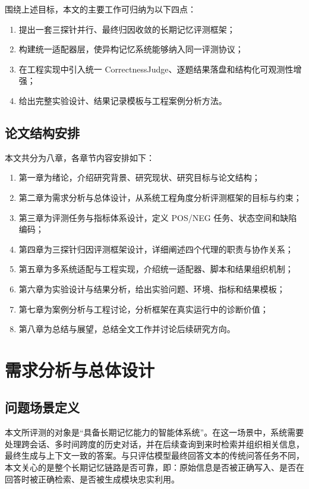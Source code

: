 围绕上述目标，本文的主要工作可归纳为以下四点：

\begin{enumerate}
    \item 提出一套三探针并行、最终归因收敛的长期记忆评测框架；
    \item 构建统一适配器层，使异构记忆系统能够纳入同一评测协议；
    \item 在工程实现中引入统一 CorrectnessJudge、逐题结果落盘和结构化可观测性增强；
    \item 给出完整实验设计、结果记录模板与工程案例分析方法。
\end{enumerate}

\section{论文结构安排}

本文共分为八章，各章节内容安排如下：

\begin{enumerate}
    \item 第一章为绪论，介绍研究背景、研究现状、研究目标与论文结构；
    \item 第二章为需求分析与总体设计，从系统工程角度分析评测框架的目标与约束；
    \item 第三章为评测任务与指标体系设计，定义 POS/NEG 任务、状态空间和缺陷编码；
    \item 第四章为三探针归因评测框架设计，详细阐述四个代理的职责与协作关系；
    \item 第五章为多系统适配与工程实现，介绍统一适配器、脚本和结果组织机制；
    \item 第六章为实验设计与结果分析，给出实验问题、环境、指标和结果模板；
    \item 第七章为案例分析与工程讨论，分析框架在真实运行中的诊断价值；
    \item 第八章为总结与展望，总结全文工作并讨论后续研究方向。
\end{enumerate}

\chapter{需求分析与总体设计}

\section{问题场景定义}

本文所评测的对象是“具备长期记忆能力的智能体系统”。在这一场景中，系统需要处理跨会话、多时间跨度的历史对话，并在后续查询到来时检索并组织相关信息，最终生成与上下文一致的答案。与只评估模型最终回答文本的传统问答任务不同，本文关心的是整个长期记忆链路是否可靠，即：原始信息是否被正确写入、是否在回答时被正确检索、是否被生成模块忠实利用。

